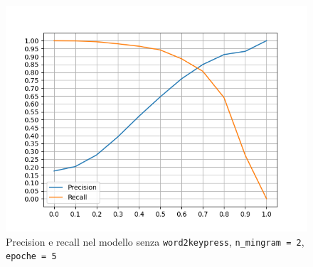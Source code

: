\begin{figure}[H]
    \centering
    \includegraphics[width=14cm]{./immagini/no_w2kp_nmingram=2_epochs=5.png}
    \caption{Precision e recall nel modello senza \texttt{word2keypress}, \texttt{n\_mingram = 2}, \texttt{epoche = 5}}
    \label{quintomodello}
\end{figure}

